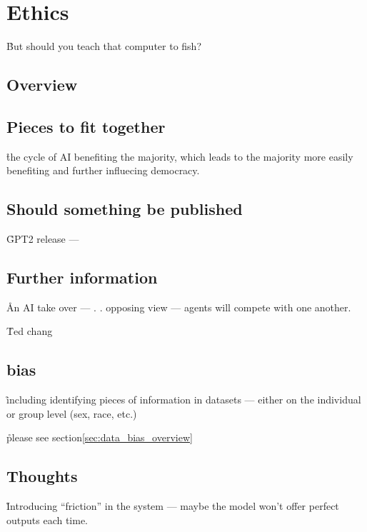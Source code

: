 \chapter{Ethics}




\r{But should you teach that computer to fish?}

\section{Overview}


\section{Pieces to fit together}


\r{the cycle of AI benefiting the majority, which leads to the majority more easily benefiting and further influecing democracy.}

\section{Should something be published}


\r{GPT2 release --- }


\section{Further information}

\r{An AI take over --- . . opposing view --- agents will compete with one another.}

\r{Ted chang}

\section{bias}

\r{including identifying pieces of information in datasets --- either on the individual or group level (sex, race, etc.)}

\r{please see section\ref{sec:data_bias_overview}}


\section{Thoughts}

\r{Introducing ``friction'' in the system --- maybe the model won't offer perfect outputs each time.}